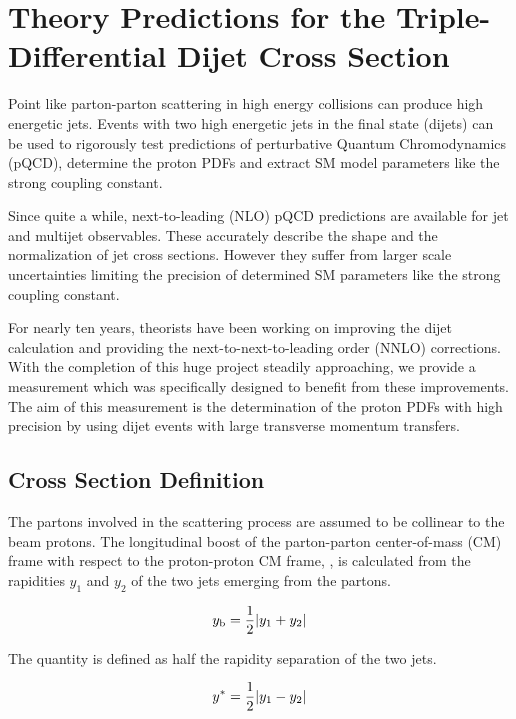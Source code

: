 
\chapter{Theory Predictions for the Triple-Differential Dijet Cross Section}

Point like parton-parton scattering in high energy collisions can produce high
energetic jets. Events with two high energetic jets in the final state (dijets)
can be used to rigorously test predictions of perturbative Quantum
Chromodynamics (pQCD), determine the proton PDFs and extract SM model parameters
like the strong coupling constant.

Since quite a while, next-to-leading (NLO) pQCD predictions are available for
jet and multijet observables. These accurately describe the shape and the
normalization of jet cross sections. However they suffer from larger scale
uncertainties limiting the precision of determined SM parameters like the strong
coupling constant.

For nearly ten years, theorists have been working on improving the dijet
calculation and providing the next-to-next-to-leading order (NNLO) corrections.
With the completion of this huge project steadily approaching, we provide a
measurement which was specifically designed to benefit from these improvements.
The aim of this measurement is the determination of the proton PDFs with high
precision by using dijet events with large transverse momentum transfers.

\section{Cross Section Definition}

The partons involved in the scattering process are assumed to be collinear to
the beam protons. The longitudinal boost of the parton-parton center-of-mass
(CM) frame with respect to the proton-proton CM frame, \yboost, is calculated from the
rapidities $y_1$ and $y_2$ of the two jets emerging from the partons. 

\begin{equation*}
    y_{\mathrm{b}} = \frac{1}{2} |y_1 + y_2|
\end{equation*}

The quantity \ystar is defined as half the rapidity separation of the two jets.

\begin{equation*}
    y^* = \frac{1}{2} |y_1 - y_2|
\end{equation*}

